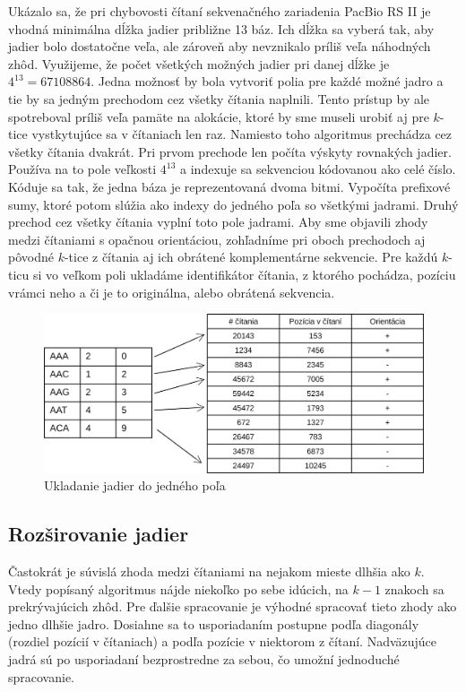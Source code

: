 Ukázalo sa, že pri chybovosti čítaní sekvenačného zariadenia PacBio RS II je vhodná minimálna dĺžka jadier približne 13 báz. Ich dĺžka sa vyberá tak, aby jadier bolo dostatočne veľa, ale zároveň aby nevznikalo príliš veľa náhodných zhôd. Využijeme, že počet všetkých možných jadier pri danej dĺžke je $4^{13} = 67108864$. Jedna možnosť by bola vytvoriť polia pre každé možné jadro a tie by sa jedným prechodom cez všetky čítania naplnili. Tento prístup by ale spotreboval príliš veľa pamäte na alokácie, ktoré by sme museli urobiť aj pre $k$-tice vystkytujúce sa v čítaniach len raz. Namiesto toho algoritmus prechádza cez všetky čítania dvakrát. Pri prvom prechode len počíta výskyty rovnakých jadier. Používa na to pole veľkosti $4^{13}$ a indexuje sa sekvenciou kódovanou ako celé číslo. Kóduje sa tak, že jedna báza je reprezentovaná dvoma bitmi. Vypočíta prefixové sumy, ktoré potom slúžia ako indexy do jedného poľa so všetkými jadrami. Druhý prechod cez všetky čítania vyplní toto pole jadrami. Aby sme objavili zhody medzi čítaniami s opačnou orientáciou, zohľadníme pri oboch prechodoch aj pôvodné $k$-tice z čítania aj ich obrátené komplementárne sekvencie. Pre každú $k$-ticu si vo veľkom poli ukladáme identifikátor čítania, z ktorého pochádza, pozíciu vrámci neho a či je to originálna, alebo obrátená sekvencia. 

\begin{figure}
    \centering
    \includegraphics[width=1\textwidth]{images/jadra_velke_pole.png}
    \caption{Ukladanie jadier do jedného poľa}
    \label{fig:velke_pole}
\end{figure} 

\subsection{Rozširovanie jadier}

Častokrát je súvislá zhoda medzi čítaniami na nejakom mieste dlhšia ako $k$. Vtedy popísaný algoritmus nájde niekoľko po sebe idúcich, na $k - 1$ znakoch sa prekrývajúcich zhôd. Pre ďalšie spracovanie je výhodné spracovať tieto zhody ako jedno dlhšie jadro. Dosiahne sa to usporiadaním postupne podľa diagonály (rozdiel pozícií v čítaniach) a podľa pozície v niektorom z čítaní. Nadväzujúce jadrá sú po usporiadaní bezprostredne za sebou, čo umožní jednoduché spracovanie.

